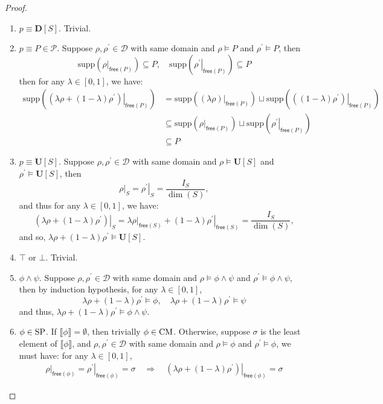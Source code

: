 \documentclass[conference,compsoc, 10pt]{IEEEtran}
\newcommand {\cD } {{\mathcal{D}}}
\newcommand {\cP } {{\mathcal{P}}}
\newcommand {\bD} {{\mathbf{D}}}
\newcommand {\free }[1] {{\mathsf{free}\left(#1\right)}}
\newcommand {\rt }[2] {{\left.{#1}\right|_{#2}}}
\newcommand {\unia } {{\mathbf{U}}}
\newcommand {\sem}[1] {\llbracket#1\rrbracket}
\newcommand {\supp } {{\mathrm{supp}}}
\begin{document}
\begin{appendices}
		\begin{proof}
			\begin{enumerate}
				\item $p\equiv\bD[S]$. Trivial.
				\item $p\equiv P\in\cP$. Suppose $\rho,\rho^\prime\in\cD$ with same domain and $\rho\models P$ and $\rho^\prime\models P$, then 
				$$\supp\left(\rt{\rho}{\free {P}}\right)\subseteq P, \quad \supp\left(\rt{\rho^\prime}{\free {P}}\right)\subseteq P$$
				then for any $\lambda\in[0,1]$, we have:
				\begin{align*}
				\supp\left(\rt{\left(\lambda\rho + (1-\lambda)\rho^\prime\right)}{\free {P}}\right) &=  \supp\left(\rt{\left(\lambda\rho\right)}{\free {P}}\right)\sqcup\supp\left(\rt{\left((1-\lambda)\rho^\prime\right)}{\free {P}}\right) \\
				&\subseteq \supp\left(\rt{\rho}{\free {P}}\right)\sqcup \supp\left(\rt{\rho^\prime}{\free {P}}\right) \\
				&\subseteq P
				\end{align*}
				\item $p\equiv\unia[S]$. Suppose $\rho,\rho^\prime\in\cD$ with same domain and $\rho\models \unia[S]$ and $\rho^\prime\models \unia[S]$, then 
				$$\rt{\rho}{S} = \rt{\rho^\prime}{S} = \frac{I_S}{\dim(S)},$$
				and thus for any $\lambda\in[0,1]$, we have:
				$$\rt{\left(\lambda\rho + (1-\lambda)\rho^\prime\right)}{S} = \lambda\rt{\rho}{\free {S}} + (1-\lambda)\rt{\rho^\prime}{\free {S}} = \frac{I_S}{\dim(S)},$$
				and so, $\lambda\rho + (1-\lambda)\rho^\prime\models \unia[S]$.
				\item $\top$ or $\bot$. Trivial.
				\item $\phi\wedge\psi$. Suppose $\rho,\rho^\prime\in\cD$ with same domain and $\rho\models \phi\wedge\psi$ and $\rho^\prime\models \phi\wedge\psi$, then by induction hypothesis, for any $\lambda\in[0,1]$, 
				$$\lambda\rho + (1-\lambda)\rho^\prime \models\phi,\quad \lambda\rho + (1-\lambda)\rho^\prime \models\psi$$
				and thus, $\lambda\rho + (1-\lambda)\rho^\prime \models\phi\wedge\psi$.
				\item $\phi\in{\rm SP}$. If $\sem{\phi} = \emptyset$, then trivially $\phi\in{\rm CM}$. Otherwise, suppose $\sigma$ is the least element of $\sem{\phi}$, and $\rho,\rho^\prime\in\cD$ with same domain and $\rho\models \phi$ and $\rho^\prime\models \phi$, we must have: for any $\lambda\in[0,1]$,
				\begin{align*}
				\rt{\rho}{\free{\phi}} = \rt{\rho^\prime}{\free{\phi}} = \sigma\quad\Rightarrow\quad \rt{\left(\lambda\rho + (1-\lambda)\rho^\prime\right)}{\free{\phi}} = \sigma

\end{align*}
\end{enumerate}
\end{proof}
\end{appendices}
\end{document}
